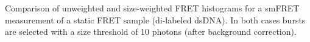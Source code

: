 \label{fig:weight_fret_meas} Comparison of unweighted and size-weighted FRET histograms for a smFRET measurement of a static FRET sample (di-labeled dsDNA). In both cases bursts are selected with a size threshold of 10 photons (after background correction).
